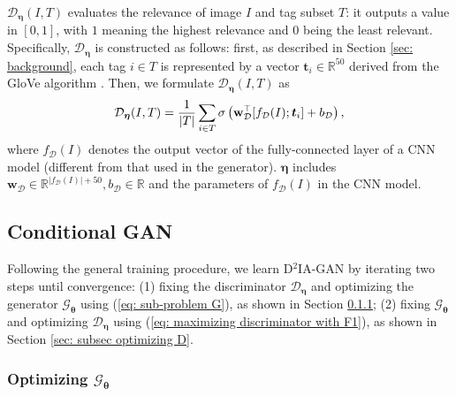 \documentclass[10pt,twocolumn,letterpaper]{article}
\newcommand{\w}{\mathbf{w}}
\newcommand{\D}{\mathcal{D}}
\newcommand{\G}{\mathcal{G}}
\begin{document}
$\D_{\boldsymbol{\eta}}(I, T)$ evaluates the relevance of image $I$ and tag subset $T$: it outputs a value in $[0,1]$, with $1$ meaning the highest relevance and $0$ being the least relevant. 
Specifically, $\D_{\boldsymbol{\eta}}$ is constructed as follows: first, as described in Section \ref{sec: background}, each tag $i \in T$ is represented by a vector $\boldsymbol{t}_i \in \mathbb{R}^{50}$ derived from the GloVe algorithm \cite{glove-2014}. Then, we formulate $\D_{\boldsymbol{\eta}}(I, T)$ as
\vspace{-0.7em}
\begin{eqnarray}
\vspace{-8em}
\D_{\boldsymbol{\eta}}(I, T) = \frac{1}{|T|}\sum_{i \in T} \sigma\left( \w_{\D}^\top [ f_{\D}(I) ; \boldsymbol{t}_i ] + b_{\D} \right),
\vspace{-8em}
\label{eq: D model}
\vspace{-8em}
\end{eqnarray}
where $f_{\D}(I)$ denotes the output vector of the fully-connected layer of a CNN model  (different from that used in the generator). 
$\boldsymbol{\eta}$ includes $\w_{\D} \in \mathbb{R}^{|f_{\D}(I)|+50}, b_{\D} \in \mathbb{R}$ and the parameters of $f_{\D}(I)$ in the CNN model. 



\subsection{Conditional GAN}
\label{sec: subsec conditional GAN}

Following the general training procedure, we learn D$^2$IA-GAN by iterating two steps until convergence: 
(1) fixing the discriminator $\D_{\boldsymbol{\eta}}$ and optimizing the generator $\G_{\boldsymbol{\theta}}$ using (\ref{eq: sub-problem G}), as shown in Section \ref{sec: subsec optimizing G}; 
(2) fixing $\G_{\boldsymbol{\theta}}$ and optimizing $\D_{\boldsymbol{\eta}}$ using (\ref{eq: maximizing discriminator with F1}), as shown in Section \ref{sec: subsec optimizing D}. 


\vspace{-0.6em}
\subsubsection{Optimizing $\G_{\boldsymbol{\theta}}$} %
\label{sec: subsec optimizing G}
\end{document}
